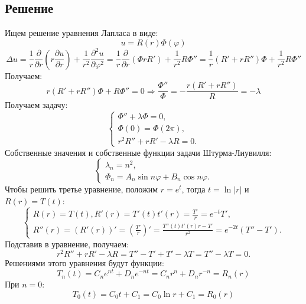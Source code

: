 \documentclass[11pt]{article}
\begin{document}
\subsection{Решение}
\label{sec:orga2f9287}
Ищем решение уравнения Лапласа в виде:
\begin{equation*}
u = R(r)\Phi(\varphi)
\end{equation*}
\begin{equation*}
\Delta u = \frac1r\frac{\partial}{\partial r}\left(r\frac{\partial u}{\partial r}\right) +
\frac1{r^2}\frac{\partial^2 u}{\partial\varphi^2} = \frac1r\frac{\partial}{\partial r}\left(\Phi rR'\right) + \frac1{r^2}R\Phi'' =
\frac1r\left(R' + rR''\right)\Phi + \frac1{r^2}R\Phi''
\end{equation*}
Получаем:
\begin{equation*}
r(R' + rR'')\Phi + R\Phi'' = 0 \Rightarrow \frac{\Phi''}{\Phi} = -\frac{r(R' + rR'')}{R} = -\lambda
\end{equation*}
Получаем задачу:
\begin{equation}
\begin{cases}
\Phi'' + \lambda\Phi = 0, \\
\Phi(0) = \Phi(2\pi), \\
r^2R'' + rR' - \lambda R = 0.
\end{cases}
\end{equation}
Собственные значения и собственные функции задачи Штурма-Лиувилля:
\begin{equation*}
\begin{cases}
\lambda_n = n^2, \\
\Phi_n = A_n\sin n\varphi + B_n\cos n\varphi.
\end{cases}
\end{equation*}
Чтобы решить третье уравнение, положим $r = e^t$, тогда $t = \ln |r|$ и $R(r) = T(t)$:
\begin{equation*}
\begin{cases}
R(r) = T(t), R'(r) = T'(t)t'(r) = \frac{T'}r = e^{-t}T', \\
R''(r) = (R'(r))' = \left(\frac{T'}r\right)' = \frac{T''(t)t'(r)r - T'}{r^2} = e^{-2t}(T'' - T').
\end{cases}
\end{equation*}
Подставив в уравнение, получаем:
\begin{equation}
r^2R'' + rR' - \lambda R = T'' - T' + T'  - \lambda T = T'' - \lambda T = 0.
\end{equation}
Решениями этого уравнения будут функции:
\begin{equation*}
T_n(t) = C_ne^{nt} + D_ne^{-nt} = C_nr^n + D_nr^{-n} = R_n(r)
\end{equation*}
При $n = 0$:
\begin{equation*}
T_0(t) = C_0t + C_1 = C_0\ln r + C_1 = R_0(r)
\end{equation*}
\end{document}

